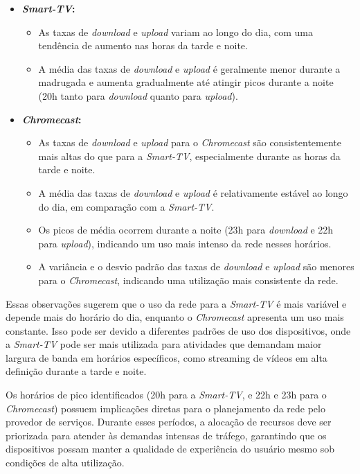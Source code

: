 \begin{itemize}
    \item \textbf{\textit{Smart-TV}:}
    \begin{itemize}
        \item As taxas de \textit{download} e \textit{upload} variam ao longo do dia, com uma tendência de aumento nas horas da tarde e noite.
        \item A média das taxas de \textit{download} e \textit{upload} é geralmente menor durante a madrugada e aumenta gradualmente até atingir picos durante a noite (20h tanto para \textit{download} quanto para \textit{upload}).
    \end{itemize}
    \item \textbf{\textit{Chromecast}:}
    \begin{itemize}
        \item As taxas de \textit{download} e \textit{upload} para o \textit{Chromecast} são consistentemente mais altas do que para a \textit{Smart-TV}, especialmente durante as horas da tarde e noite.
        \item A média das taxas de \textit{download} e \textit{upload} é relativamente estável ao longo do dia, em comparação com a \textit{Smart-TV}.
        \item Os picos de média ocorrem durante a noite (23h para \textit{download} e 22h para \textit{upload}), indicando um uso mais intenso da rede nesses horários.
        \item A variância e o desvio padrão das taxas de \textit{download} e \textit{upload} são menores para o \textit{Chromecast}, indicando uma utilização mais consistente da rede.
    \end{itemize}
\end{itemize}

Essas observações sugerem que o uso da rede para a \textit{Smart-TV} é mais variável e depende mais do horário do dia, enquanto o \textit{Chromecast} apresenta um uso mais constante. Isso pode ser devido a diferentes padrões de uso dos dispositivos, onde a \textit{Smart-TV} pode ser mais utilizada para atividades que demandam maior largura de banda em horários específicos, como streaming de vídeos em alta definição durante a tarde e noite.

Os horários de pico identificados (20h para a \textit{Smart-TV}, e 22h e 23h para o \textit{Chromecast}) possuem implicações diretas para o planejamento da rede pelo provedor de serviços. Durante esses períodos, a alocação de recursos deve ser priorizada para atender às demandas intensas de tráfego, garantindo que os dispositivos possam manter a qualidade de experiência do usuário mesmo sob condições de alta utilização.

